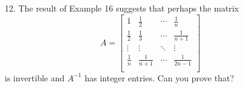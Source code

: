 \documentclass{article}
\begin{document}
\begin{enumerate}[listparindent=\parindent]
\item[12.] The result of Example 16 suggests that perhaps the matrix
    \[
        A = \begin{bmatrix}
            1 & \frac{1}{2} & \dotsb & \frac{1}{n} \\
            \frac{1}{2} & \frac{1}{3} & \dotsb & \frac{1}{n+1} \\
            \vdots & \vdots & \ddots & \vdots \\
            \frac{1}{n} & \frac{1}{n+1} & \dotsb & \frac{1}{2n-1} \\
        \end{bmatrix}
    \] is invertible and \(A^{-1}\) has integer entries. Can you prove that?

\end{enumerate}
\end{document}
